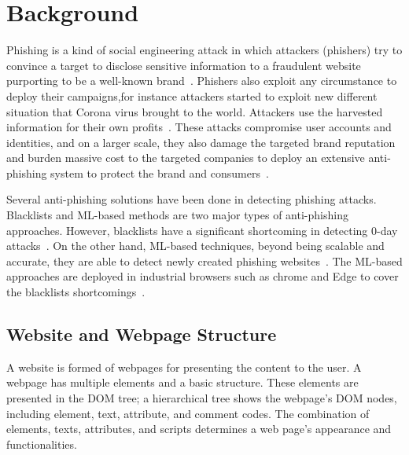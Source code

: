 
\section{Background}
\label{s:background}
Phishing is a kind of social engineering attack in which attackers (phishers) try to convince a target to disclose sensitive information to a fraudulent website purporting to be a well-known brand~\cite{dodge2007phishing,holz2009learning,mcgrath2008behind}. Phishers also exploit any circumstance to deploy their campaigns,for instance attackers started to exploit new different situation that Corona virus brought to the world\cite{bitaab2020scampandamic}.
Attackers use the harvested information for their own profits~\cite{sood2013crimeware,aleroud2017phishing}.
These attacks compromise user accounts and identities, and on a larger scale, they also damage the targeted brand reputation and burden massive cost to the targeted companies to deploy an extensive anti-phishing system to protect the brand and consumers~\cite{hong2012state}.

Several anti-phishing solutions have been done in detecting phishing attacks. Blacklists and ML-based methods are two major types of anti-phishing approaches. However, blacklists have a significant shortcoming in detecting 0-day attacks~\cite{oest2019phishfarm}. 
On the other hand, ML-based techniques, beyond being scalable and accurate, they are able to detect newly created phishing websites~\cite{whittaker2010large}.
The ML-based approaches are deployed in industrial browsers such as chrome and Edge to cover the blacklists shortcomings~\cite{safebrowsing,mjcaparas}.

\subsection{Website and Webpage Structure}
A website is formed of webpages for presenting the content to the user. A webpage has multiple elements and a basic structure. These elements are presented in the DOM tree; a hierarchical tree shows the webpage's DOM nodes, including element, text, attribute, and comment codes.
The combination of elements, texts, attributes, and scripts determines a web page's appearance and functionalities.


